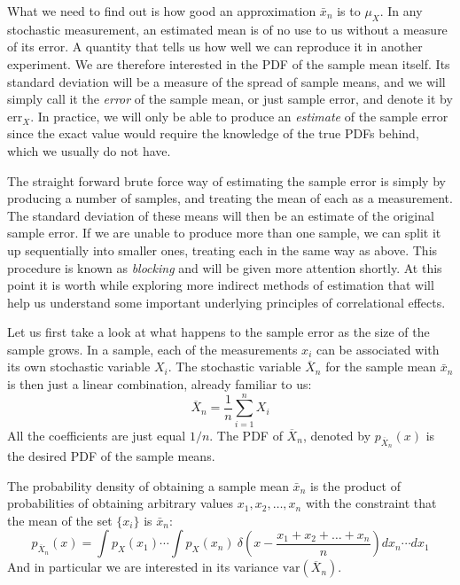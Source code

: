 \documentclass[graybox,sectrefs,envcountresetchap,open=right]{svmonodo}
\begin{document}
What we need to find out is how good an approximation $\bar{x}_n$ is to
$\mu_X^{\phantom X}$. In any stochastic measurement, an estimated
mean is of no use to us without a measure of its error. A quantity
that tells us how well we can reproduce it in another experiment. We
are therefore interested in the PDF of the sample mean itself. Its
standard deviation will be a measure of the spread of sample means,
and we will simply call it the \emph{error} of the sample mean, or
just sample error, and denote it by $\mathrm{err}_X^{\phantom X}$. In
practice, we will only be able to produce an \emph{estimate} of the
sample error since the exact value would require the knowledge of the
true PDFs behind, which we usually do not have.





The straight forward brute force way of estimating the sample error is
simply by producing a number of samples, and treating the mean of each
as a measurement. The standard deviation of these means will then be
an estimate of the original sample error. If we are unable to produce
more than one sample, we can split it up sequentially into smaller
ones, treating each in the same way as above. This procedure is known
as \emph{blocking} and will be given more attention shortly. At this
point it is worth while exploring more indirect methods of estimation
that will help us understand some important underlying principles of
correlational effects.






Let us first take a look at what happens to the sample error as the
size of the sample grows. In a sample, each of the measurements $x_i$
can be associated with its own stochastic variable $X_i$. The
stochastic variable $\overline X_n$ for the sample mean $\bar{x}_n$ is
then just a linear combination, already familiar to us:
\[
\overline X_n = \frac{1}{n}\sum_{i=1}^n X_i
\]
All the coefficients are just equal $1/n$. The PDF of $\overline X_n$,
denoted by $p_{\overline X_n}(x)$ is the desired PDF of the sample
means. 





The probability density of obtaining a sample mean $\bar x_n$
is the product of probabilities of obtaining arbitrary values $x_1,
x_2,\dots,x_n$ with the constraint that the mean of the set $\{x_i\}$
is $\bar x_n$:
\[
p_{\overline X_n}(x) = \int p_X^{\phantom X}(x_1)\cdots
\int p_X^{\phantom X}(x_n)\ 
\delta\!\left(x - \frac{x_1+x_2+\dots+x_n}{n}\right)dx_n \cdots dx_1
\]
And in particular we are interested in its variance $\mathrm{var}(\overline X_n)$.
\end{document}
